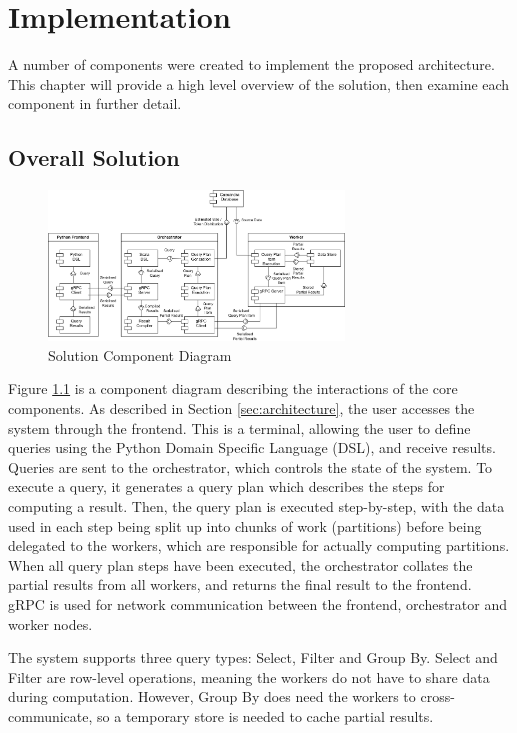\chapter{Implementation}\label{cha:implementation}

A number of components were created to implement the proposed architecture. This chapter will provide a high level overview of the solution, then examine each component in further detail.

\section{Overall Solution}
\begin{figure}[h]
	\centering
	\includegraphics[width=0.7\textwidth]{chapters/diagrams/implementation/component-architecture-diagram}
	\caption{Solution Component Diagram}
	\label{fig:component-architecture-diagram}
\end{figure}

Figure \ref{fig:component-architecture-diagram} is a component diagram describing the interactions of the core components. As described in Section \ref{sec:architecture}, the user accesses the system through the frontend. This is a terminal, allowing the user to define queries using the Python Domain Specific Language (DSL), and receive results. Queries are sent to the orchestrator, which controls the state of the system. To execute a query, it generates a query plan which describes the steps for computing a result. Then, the query plan is executed step-by-step, with the data used in each step being split up into chunks of work (partitions) before being delegated to the workers, which are responsible for actually computing partitions. When all query plan steps have been executed, the orchestrator collates the partial results from all workers, and returns the final result to the frontend. gRPC is used for network communication between the frontend, orchestrator and worker nodes.

The system supports three query types: Select, Filter and Group By. Select and Filter are row-level operations, meaning the workers do not have to share data during computation. However, Group By does need the workers to cross-communicate, so a temporary store is needed to cache partial results.

